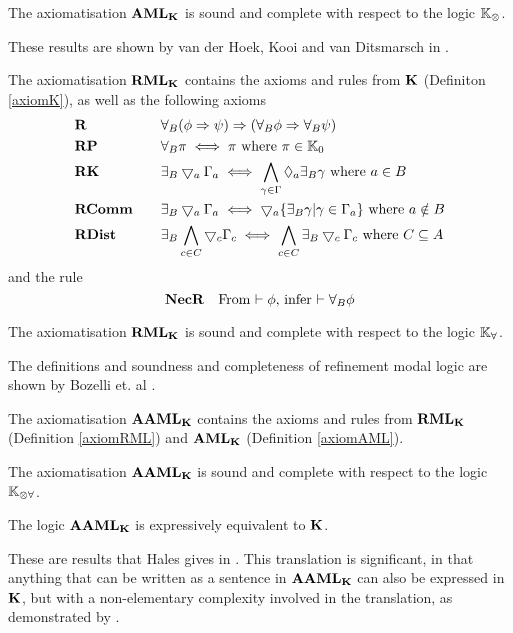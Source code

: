 \begin{lemma} \label{axiomAMLSoundComplete}
The axiomatisation $\bf AML_{\bf K}$ is sound and complete with respect to the logic $\mathbb{K}_{\otimes}$.
\end{lemma}

These results are shown by van der Hoek, Kooi and van Ditsmarsch in \cite{hoek2008dynamic}.

\begin{defn} \label{axiomRML}
The axiomatisation $\bf RML_{\bf K}$ contains the axioms and rules from $\bf K$ (Definiton \ref{axiomK}), as well as the following axioms
\begin{alignat*}{2}
	& \bf R && \quad \forall_B (\phi \Rightarrow \psi) \Rightarrow (\forall_B \phi \Rightarrow \forall_B \psi) \\
	& \bf RP && \quad \forall_B \pi \iff \pi \text{ where } \pi \in \mathbb{K}_0 \\
	& \bf RK && \quad\exists_B \bigtriangledown_a \Gamma_a \iff \bigwedge_{\gamma \in \Gamma} \Diamond_a \exists_B
	\gamma \text{ where } a \in B \\
	& \bf RComm && \quad \exists_B \bigtriangledown_a \Gamma_a \iff \bigtriangledown_a \{ \exists_B \gamma | \gamma \in
	\Gamma_a\} \text{ where } a \notin B\\
	& \bf RDist && \quad \exists_B \bigwedge_{c \in C} \bigtriangledown_c \Gamma_c \iff \bigwedge_{c \in C}
	\exists_B \bigtriangledown_c \Gamma_c \text{ where } C \subseteq A
\end{alignat*}
and the rule
\[
	\bf NecR \quad \text{From $\vdash \phi$, infer $\vdash \forall_B \phi$}
\]
\end{defn}

\begin{lemma} \label{axiomRMLSoundComplete}
The axiomatisation $\bf RML_{\bf K}$ is sound and complete with respect to the logic $\mathbb{K}_{\forall}$.
\end{lemma}

The definitions and soundness and completeness of refinement modal logic are shown by Bozelli et. al
\cite{DBLPjournalscorrabs12023538}.

\begin{defn} \label{axiomAAML}
The axiomatisation $\bf AAML_{\bf K}$ contains the axioms and rules from $\bf RML_{\bf K}$ (Definition \ref{axiomRML})
and $\bf AML_{\bf K}$ (Definition \ref{axiomAML}).
\end{defn}

\begin{thm} \label{axiomAAMLSoundComplete}
The axiomatisation $\bf AAML_{\bf K}$ is sound and complete with respect to the logic $\mathbb{K}_{\otimes\forall}$.
\end{thm}

\begin{thm} \label{thm:AAMLExpressivelyEquivalent}
The logic $\bf AAML_{\bf K}$ is expressively equivalent to $\bf K$.
\end{thm}

These are results that Hales gives in \cite{hales13synthesis}.
This translation is significant, in that anything that can be written as a sentence in $\bf AAML_{\bf K}$ can
also be expressed in $\bf K$, but with a non-elementary complexity involved in the translation, as
demonstrated by \cite{van2010future}.
